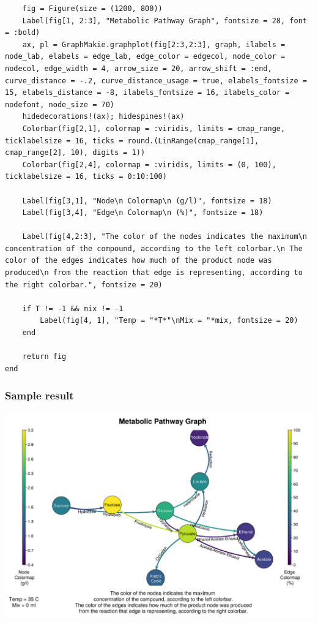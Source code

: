\documentclass[11pt]{article}
\begin{document}
\begin{verbatim}
    fig = Figure(size = (1200, 800))
    Label(fig[1, 2:3], "Metabolic Pathway Graph", fontsize = 28, font = :bold)
    ax, pl = GraphMakie.graphplot(fig[2:3,2:3], graph, ilabels = node_lab, elabels = edge_lab, edge_color = edgecol, node_color = nodecol, edge_width = 4, arrow_size = 20, arrow_shift = :end, curve_distance = -.2, curve_distance_usage = true, elabels_fontsize = 15, elabels_distance = -8, ilabels_fontsize = 16, ilabels_color = nodefont, node_size = 70)
    hidedecorations!(ax); hidespines!(ax)
    Colorbar(fig[2,1], colormap = :viridis, limits = cmap_range, ticklabelsize = 16, ticks = round.(LinRange(cmap_range[1], cmap_range[2], 10), digits = 1))
    Colorbar(fig[2,4], colormap = :viridis, limits = (0, 100), ticklabelsize = 16, ticks = 0:10:100)

    Label(fig[3,1], "Node\n Colormap\n (g/l)", fontsize = 18)
    Label(fig[3,4], "Edge\n Colormap\n (%)", fontsize = 18)

    Label(fig[4,2:3], "The color of the nodes indicates the maximum\n concentration of the compound, according to the left colorbar.\n The color of the edges indicates how much of the product node was produced\n from the reaction that edge is representing, according to the right colorbar.", fontsize = 20)

    if T != -1 && mix != -1
        Label(fig[4, 1], "Temp = "*T*"\nMix = "*mix, fontsize = 20)
    end

    return fig
end
\end{verbatim}

\subsubsection{Sample result}
\label{sec:org1682c98}
\begin{center}
\includegraphics[width=.9\linewidth]{../plots/metabolic_results/35_0.png}
\end{center}
\end{document}
